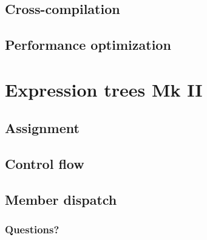 \documentclass{beamer}
\begin{document}
\subsection{Cross-compilation}
\subsection{Performance optimization}

\section{Expression trees Mk II}
\subsection{Assignment}
\subsection{Control flow}
\subsection{Member dispatch}

\begin{frame}
	\frametitle{Questions?}
\end{frame}
\end{document}
